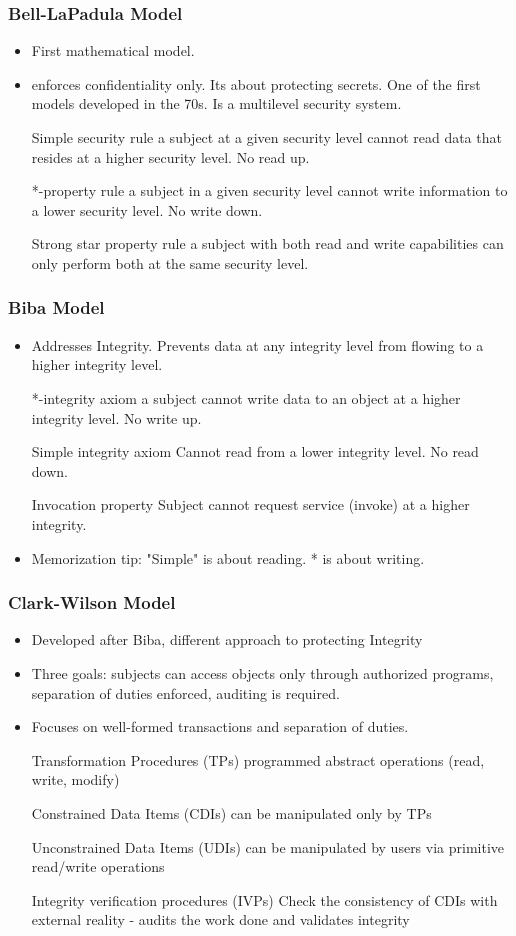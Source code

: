 \documentclass[11pt]{article}
\begin{document}
\subsubsection{Bell-LaPadula Model}
\label{sec:org03037cc}
\begin{itemize}
\item First mathematical model.
\item enforces confidentiality only. Its about protecting secrets. One of the first models developed in the 70s. Is a multilevel security system.
\item[{Simple security rule}] a subject at a given security level cannot read data that resides at a higher security level. No read up.
\item[{*-property rule}] a subject in a given security level cannot write information to a lower security level. No write down.
\item[{Strong star property rule}] a subject with both read and write capabilities can only perform both at the same security level.
\end{itemize}
\subsubsection{Biba Model}
\label{sec:org1970de3}
\begin{itemize}
\item Addresses Integrity. Prevents data at any integrity level from flowing to a higher integrity level.
\item[{*-integrity axiom}] a subject cannot write data to an object at a higher integrity level. No write up.
\item[{Simple integrity axiom}] Cannot read from a lower integrity level. No read down.
\item[{Invocation property}] Subject cannot request service (invoke) at a higher integrity.
\item Memorization tip: "Simple" is about reading. * is about writing.
\end{itemize}
\subsubsection{Clark-Wilson Model}
\label{sec:orgc08e932}
\begin{itemize}
\item Developed after Biba, different approach to protecting Integrity
\item Three goals: subjects can access objects only through authorized programs, separation of duties enforced, auditing is required.
\item Focuses on well-formed transactions and separation of duties.
\item[{Transformation Procedures (TPs)}] programmed abstract operations (read, write, modify)
\item[{Constrained Data Items (CDIs)}] can be manipulated only by TPs
\item[{Unconstrained Data Items (UDIs)}] can be manipulated by users via primitive read/write operations
\item[{Integrity verification procedures (IVPs)}] Check the consistency of CDIs with external reality - audits the work done and validates integrity
\end{itemize}
\end{document}
